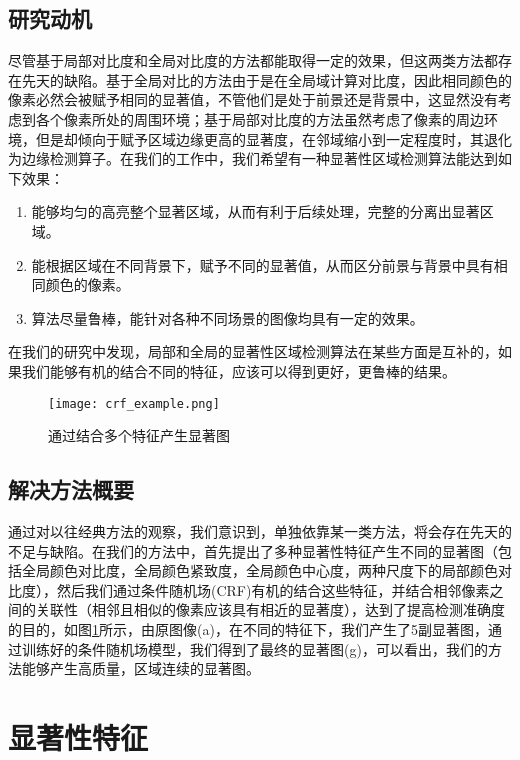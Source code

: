 \subsection{研究动机}
尽管基于局部对比度和全局对比度的方法都能取得一定的效果，但这两类方法都存在先天的缺陷。基于全局对比的方法由于是在全局域计算对比度，因此相同颜色的像素必然会被赋予相同的显著值，不管他们是处于前景还是背景中，这显然没有考虑到各个像素所处的周围环境；基于局部对比度的方法虽然考虑了像素的周边环境，但是却倾向于赋予区域边缘更高的显著度，在邻域缩小到一定程度时，其退化为边缘检测算子。在我们的工作中，我们希望有一种显著性区域检测算法能达到如下效果：
\begin{enumerate}
\item 能够均匀的高亮整个显著区域，从而有利于后续处理，完整的分离出显著区域。
\item 能根据区域在不同背景下，赋予不同的显著值，从而区分前景与背景中具有相同颜色的像素。
\item 算法尽量鲁棒，能针对各种不同场景的图像均具有一定的效果。
\end{enumerate}
在我们的研究中发现，局部和全局的显著性区域检测算法在某些方面是互补的，如果我们能够有机的结合不同的特征，应该可以得到更好，更鲁棒的结果。

\begin{figure}
\centering
\texttt{[image: crf\_example.png]}
\caption{通过结合多个特征产生显著图}\label{fig:crf_example}
\end{figure}

\subsection{解决方法概要}
通过对以往经典方法的观察，我们意识到，单独依靠某一类方法，将会存在先天的不足与缺陷。在我们的方法中，首先提出了多种显著性特征产生不同的显著图（包括全局颜色对比度，全局颜色紧致度，全局颜色中心度，两种尺度下的局部颜色对比度），然后我们通过条件随机场(CRF)有机的结合这些特征，并结合相邻像素之间的关联性（相邻且相似的像素应该具有相近的显著度），达到了提高检测准确度的目的，如图\ref{fig:crf_example}所示，由原图像(a)，在不同的特征下，我们产生了5副显著图，通过训练好的条件随机场模型，我们得到了最终的显著图(g)，可以看出，我们的方法能够产生高质量，区域连续的显著图。

\section{显著性特征}
